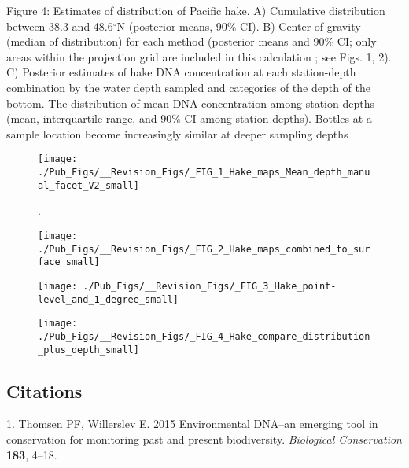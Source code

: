 \documentclass[
]{article}
\begin{document}
Figure 4: Estimates of distribution of Pacific hake. A) Cumulative distribution between 38.3 and 48.6$^{\circ}$N (posterior means, 90\% CI). B) Center of gravity (median of distribution) for each method (posterior means and 90\% CI; only areas within the projection grid are included in this calculation ; see Figs. 1, 2). C) Posterior estimates of hake DNA concentration at each station-depth combination by the water depth sampled and categories of the depth of the bottom. The distribution of mean DNA concentration among station-depths (mean, interquartile range, and 90\% CI among station-depths). Bottles at a sample location become increasingly similar at deeper sampling depths

\begin{figure}
\texttt{[image: ./Pub\_Figs/\_\_Revision\_Figs/\_FIG\_1\_Hake\_maps\_Mean\_depth\_manual\_facet\_V2\_small]} \caption{\label{fig:mean.maps} .}\label{fig:fig.mean.maps}
\end{figure}

\clearpage

\begin{figure}
\texttt{[image: ./Pub\_Figs/\_\_Revision\_Figs/\_FIG\_2\_Hake\_maps\_combined\_to\_surface\_small]} \caption{\label{fig:surface.compare}     }\label{fig:fig.surface.compare}
\end{figure}

\clearpage

\begin{figure}
\texttt{[image: ./Pub\_Figs/\_\_Revision\_Figs/\_FIG\_3\_Hake\_point-level\_and\_1\_degree\_small]} \caption{\label{fig:pairwise} }\label{fig:fig.pairwise}
\end{figure}

\clearpage

\begin{figure}
\texttt{[image: ./Pub\_Figs/\_\_Revision\_Figs/\_FIG\_4\_Hake\_compare\_distribution\_plus\_depth\_small]} \caption{\label{fig:COG}  }\label{fig:fig.COG}
\end{figure}

\clearpage

\hypertarget{citations}{%
\subsection*{Citations}\label{citations}}

\hypertarget{refs}{}
\leavevmode\hypertarget{ref-thomsen2015environmental}{}%
1. Thomsen PF, Willerslev E. 2015 Environmental DNA--an emerging tool in
conservation for monitoring past and present biodiversity.
\emph{Biological Conservation} \textbf{183}, 4--18.
\end{document}
